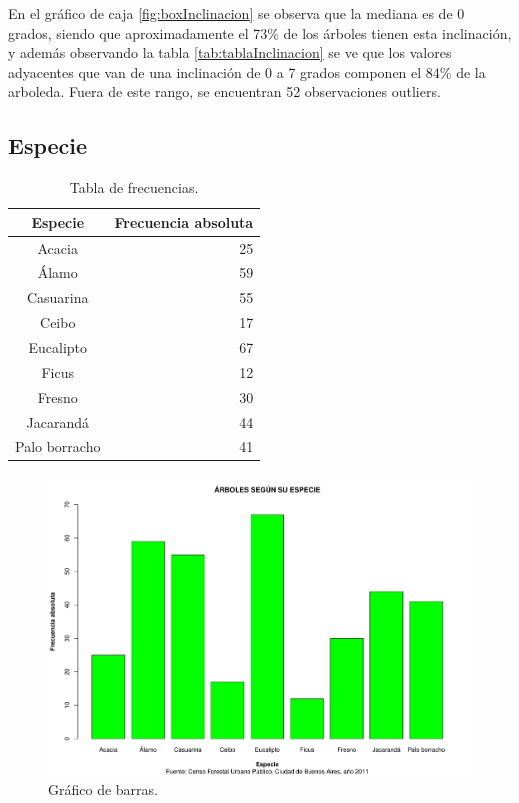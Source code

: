 \documentclass[11pt]{article}
\begin{document}
\begin{justify}
  En el gráfico de caja \ref{fig:boxInclinacion} se observa que la mediana
  es de 0 grados, siendo que aproximadamente el 73\% de los árboles tienen
  esta inclinación, y además observando la tabla \ref{tab:tablaInclinacion}
  se ve que los valores adyacentes que van de una inclinación de 0 a 7 grados
  componen el 84\% de la arboleda. Fuera de este rango, se encuentran
  52 observaciones outliers. 
\end{justify}


\newpage
\subsection{Especie}

\begin{table}[h!]
  \begin{center}
    \begin{tabular}{| c | r |}
      \hline
      \textbf{Especie} & \textbf{Frecuencia absoluta} \\ \hline
      Acacia & 25 \\ \hline
      Álamo & 59 \\ \hline
      Casuarina & 55 \\ \hline
      Ceibo & 17 \\ \hline
      Eucalipto & 67 \\ \hline
      Ficus & 12 \\ \hline
      Fresno & 30 \\ \hline
      Jacarandá & 44 \\ \hline
      Palo borracho & 41 \\ \hline
    \end{tabular}
    \caption{Tabla de frecuencias.}
    \label{tab:tablaEspecie}
  \end{center}
\end{table}

\begin{figure}[h!]
  \begin{center}
    \includegraphics[width=\linewidth]{barrasEspecie.pdf}
    \caption{Gráfico de barras.}
    \label{fig:barrasEspecie}
  \end{center}  
\end{figure}
\end{document}
